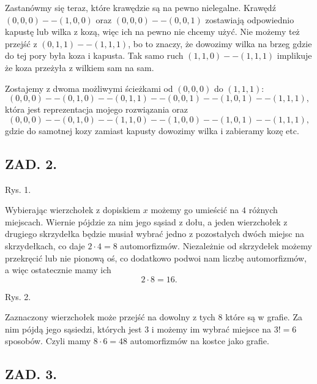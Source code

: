 \documentclass{article}
\begin{document}
    Zastanówmy się teraz, które krawędzie są na pewno nielegalne. Krawędź $(0,0,0)--(1,0,0)$ oraz $(0,0,0)--(0,0,1)$ zostawiają odpowiednio kapustę lub wilka z kozą, więc ich na pewno nie chcemy użyć. Nie możemy też przejść z $(0,1,1)--(1,1,1)$, bo to znaczy, że dowozimy wilka na brzeg gdzie do tej pory była koza i kapusta. Tak samo ruch $(1,1,0)--(1,1,1)$ implikuje że koza przeżyła z wilkiem sam na sam.

    Zostajemy z dwoma możliwymi ścieżkami od $(0,0,0)$ do $(1,1,1)$:
    $$(0,0,0)--(0,1,0)--(0,1,1)--(0,0,1)--(1,0,1)--(1,1,1),$$
    która jest reprezentacja mojego rozwiązania oraz
    $$(0,0,0)--(0,1,0)--(1,1,0)--(1,0,0)--(1,0,1)--(1,1,1),$$
    gdzie do samotnej kozy zamiast kapusty dowozimy wilka i zabieramy kozę etc.

    \subsection*{ZAD. 2.}

    Rys. 1.
    \smallskip

    Wybierając wierzchołek z dopiskiem $x$ możemy go umieścić na $4$ różnych miejscach. Wiernie pójdzie za nim jego sąsiad z dołu, a jeden wierzchołek z drugiego skrzydełka będzie musiał wybrać jedno z pozostałych dwóch miejsc na skrzydełkach, co daje $2\cdot 4=8$ automorfizmów. Niezależnie od skrzydełek możemy przekręcić lub nie pionową oś, co dodatkowo podwoi nam liczbę automorfizmów, a więc ostatecznie mamy ich
    $$2\cdot 8=16.$$

    Rys. 2.
    \smallskip

    Zaznaczony wierzchołek może przejść na dowolny z tych $8$ które są w grafie. Za nim pójdą jego sąsiedzi, których jest $3$ i możemy im wybrać miejsce na $3!=6$ sposobów. Czyli mamy $8\cdot6=48$ automorfizmów na kostce jako grafie.

    \subsection*{ZAD. 3.}
\end{document}
